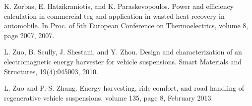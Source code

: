  K. Zorbas, E. Hatzikraniotis, and K. Paraskevopoulos. Power and efficiency calculation in commercial teg and application in wasted heat recovery in automobile. In Proc. of 5th European Conference on Thermoelectrics, volume 8, page 2007, 2007.

 L. Zuo, B. Scully, J. Shestani, and Y. Zhou. Design and characterization of an electromagnetic energy harvester for vehicle suspensions. Smart Materials and Structures, 19(4):045003, 2010.

 L. Zuo and P.-S. Zhang. Energy harvesting, ride comfort, and road handling of regenerative vehicle suspensions. volume 135, page 8, February 2013.
